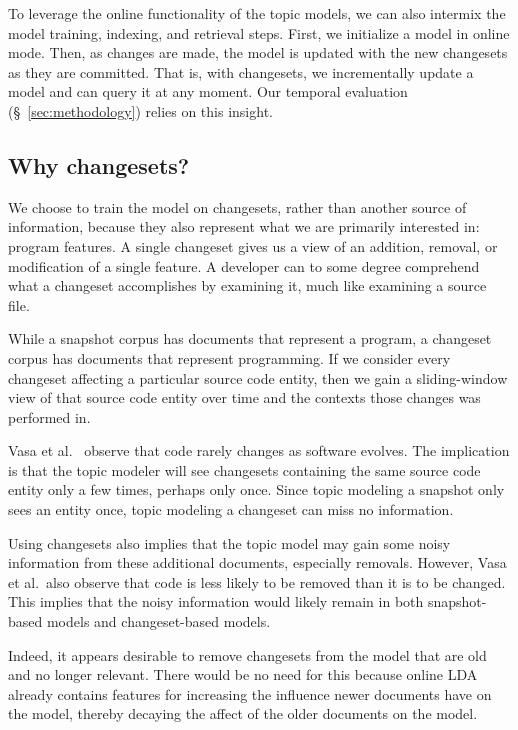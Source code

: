 To leverage the online functionality of the topic models, we can also intermix
the model training, indexing, and retrieval steps.  First, we initialize a model
in online mode.  Then, as changes are made, the model is updated with the new
changesets as they are committed.  That is, with changesets, we incrementally
update a model and can query it at any moment.  Our temporal evaluation
(\S~\ref{sec:methodology}) relies on this insight.



\subsection{Why changesets?}

We choose to train the model on changesets, rather than another source of
information, because they also represent what we are primarily interested in:
program features.  A single changeset gives us a view of an addition, removal,
or modification of a single feature.  A developer can to some degree comprehend
what a changeset accomplishes by examining it, much like examining a source
file.

While a snapshot corpus has documents that represent a program, a changeset
corpus has documents that represent programming.  If we consider every changeset
affecting a particular source code entity, then we gain a sliding-window view of
that source code entity over time and the contexts those changes was performed
in.

Vasa et al.~\cite{Vasa-etal:2007} observe that code rarely changes as software
evolves. The implication is that the topic modeler will see changesets
containing the same source code entity only a few times, perhaps only once.
Since topic modeling a snapshot only sees an entity once, topic modeling
a changeset can miss no information.

Using changesets also implies that the topic model may gain some noisy
information from these additional documents, especially removals.  However, Vasa
et al.\ also observe that code is less likely to be removed than it is to be
changed. This implies that the noisy information would likely remain in both
snapshot-based models and changeset-based models.

Indeed, it appears desirable to remove changesets from the model that are old
and no longer relevant. There would be no need for this because online LDA
already contains features for increasing the influence newer documents have on
the model, thereby decaying the affect of the older documents on the model.


